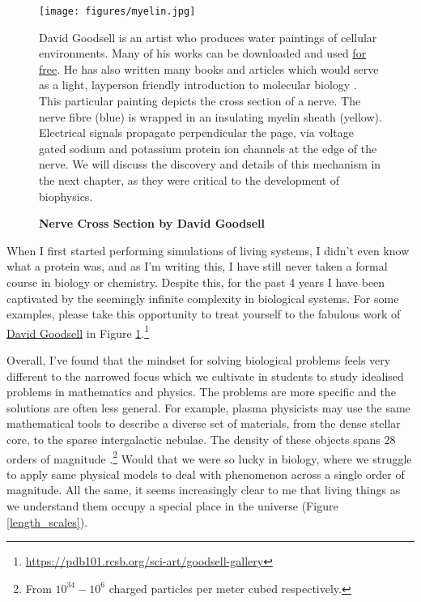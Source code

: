 \begin{figure}[h]
	\begin{center}
		\texttt{[image: figures/myelin.jpg]}
	\end{center}
	\captionsetup{singlelinecheck = false, justification=raggedright}
	\caption[Nerve Cross Section by David Goodsell] {\textbf{Nerve Cross Section by David Goodsell}}{David Goodsell is an artist who produces water paintings of cellular environments. Many of his works can be downloaded and used \href{https://pdb101.rcsb.org/sci-art/goodsell-gallery}{for free}. He has also written many books and articles which would serve as a light, layperson friendly introduction to molecular biology \cite{goodsell2009, goodsell2018, goodsell2020}. This particular painting depicts the cross section of a nerve. The nerve fibre (blue) is wrapped in an insulating myelin sheath (yellow). Electrical signals propagate perpendicular the page, via voltage gated sodium and potassium protein ion channels at the edge of the nerve\cite{goodsell_nerve}. We will discuss the discovery and details of this mechanism in the next chapter, as they were critical to the development of biophysics.}
	\label{goodsell_figure}
\end{figure}

When I first started performing simulations of living systems, I didn't even know what a protein was, and as I'm writing this, I have still never taken a formal course in biology or chemistry. Despite this, for the past 4 years I have been captivated by the seemingly infinite complexity in biological systems. For some examples, please take this opportunity to treat yourself to the fabulous work of \href {https://pdb101.rcsb.org/sci-art/goodsell-gallery}{David Goodsell} in Figure \ref{goodsell_figure}.\footnote{\href{https://pdb101.rcsb.org/sci-art/goodsell-gallery}{https://pdb101.rcsb.org/sci-art/goodsell-gallery}} 

Overall, I've found that the mindset for solving biological problems feels very different to the narrowed focus which we cultivate in students to study idealised problems in mathematics and physics. The problems are more specific and the solutions are often less general. For example, plasma physicists may use the same mathematical tools to describe a diverse set of materials, from the dense stellar core, to the sparse intergalactic nebulae. The density of these objects spans 28 orders of magnitude \cite{chen2018}.\footnote{From $10^{34}-10^6$ charged particles per meter cubed respectively.} Would that we were so lucky in biology, where we struggle to apply same physical models to deal with phenomenon across a single order of magnitude. All the same, it seems increasingly clear to me that living things as we understand them occupy a special place in the universe (Figure \ref{length_scales}). 


